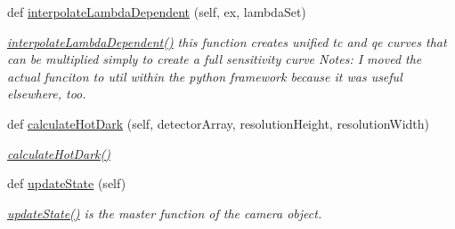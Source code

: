 \begin{DoxyCompactItemize}
def \hyperlink{classcamera_1_1camera_af238bceaf20ae4b7480fe8fb798a0d96}{interpolate\+Lambda\+Dependent} (self, ex, lambda\+Set)
\begin{DoxyCompactList}\small\item\em \hyperlink{classcamera_1_1camera_af238bceaf20ae4b7480fe8fb798a0d96}{interpolate\+Lambda\+Dependent()} this function creates unified tc and qe curves that can be multiplied simply to create a full sensitivity curve Notes\+: I moved the actual funciton to util within the python framework because it was useful elsewhere, too. \end{DoxyCompactList}\item 
def \hyperlink{classcamera_1_1camera_ad4aee85257a01b49869bf21a4ce6f7f8}{calculate\+Hot\+Dark} (self, detector\+Array, resolution\+Height, resolution\+Width)
\begin{DoxyCompactList}\small\item\em \hyperlink{classcamera_1_1camera_ad4aee85257a01b49869bf21a4ce6f7f8}{calculate\+Hot\+Dark()} \end{DoxyCompactList}\item 
def \hyperlink{classcamera_1_1camera_afd4c4aea63d44aa43d53ccd4110be3a8}{update\+State} (self)
\begin{DoxyCompactList}\small\item\em \hyperlink{classcamera_1_1camera_afd4c4aea63d44aa43d53ccd4110be3a8}{update\+State()} is the master function of the camera object. \end{DoxyCompactList}\end{DoxyCompactItemize}
